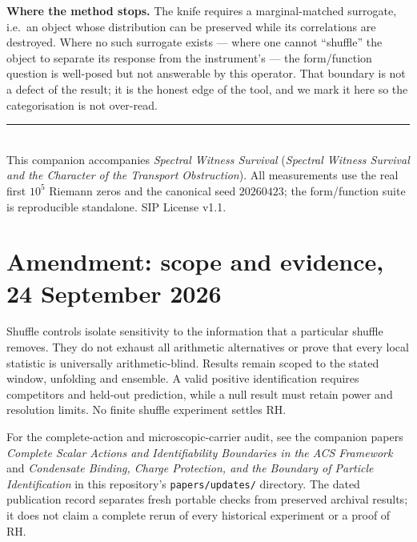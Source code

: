\documentclass[11pt]{article}
\begin{document}
\textbf{Where the method stops.} The knife requires a marginal-matched surrogate, i.e.\ an object whose distribution can be preserved while its correlations are destroyed. Where no such surrogate exists --- where one cannot ``shuffle'' the object to separate its response from the instrument's --- the form/function question is well-posed but not answerable by this operator. That boundary is not a defect of the result; it is the honest edge of the tool, and we mark it here so the categorisation is not over-read.

\vspace{1em}
\noindent\rule{\linewidth}{0.4pt}\\
\small This companion accompanies \textit{Spectral Witness Survival} (\emph{Spectral Witness Survival and the Character of the Transport Obstruction}). All measurements use the real first $10^5$ Riemann zeros and the canonical seed $20260423$; the form/function suite is reproducible standalone. SIP License v1.1.


\section*{Amendment: scope and evidence, 24 September 2026}
Shuffle controls isolate sensitivity to the information that a particular shuffle removes. They do not exhaust all arithmetic alternatives or prove that every local statistic is universally arithmetic-blind. Results remain scoped to the stated window, unfolding and ensemble. A valid positive identification requires competitors and held-out prediction, while a null result must retain power and resolution limits. No finite shuffle experiment settles RH.

For the complete-action and microscopic-carrier audit, see the companion
papers \emph{Complete Scalar Actions and Identifiability Boundaries in the ACS
Framework} and \emph{Condensate Binding, Charge Protection, and the Boundary
of Particle Identification} in this repository's \texttt{papers/updates/}
directory. The dated publication record separates fresh portable checks
from preserved archival results; it does not claim a complete rerun of every
historical experiment or a proof of RH.
\end{document}
